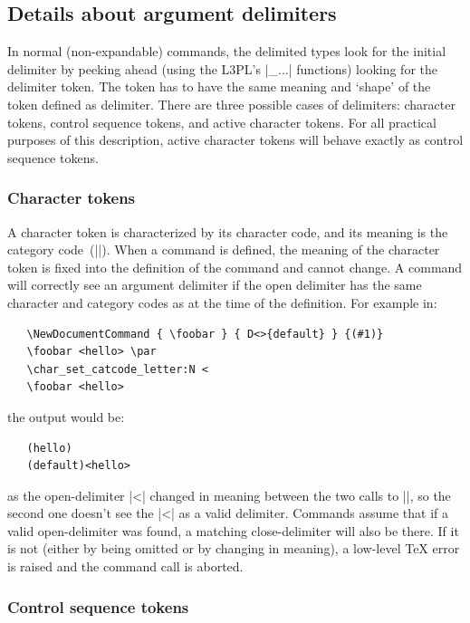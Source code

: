 \documentclass{ltxguide}
\begin{document}
\subsection{Details about argument delimiters}

In normal (non-expandable) commands, the delimited types look for the
initial delimiter by peeking ahead (using the L3PL's |\peek_...|
functions) looking for the delimiter token.  The token has to have the
same meaning and `shape' of the token defined as delimiter.
There are three possible cases of delimiters: character tokens, control
sequence tokens, and active character tokens.  For all practical purposes
of this description, active character tokens will behave exactly as
control sequence tokens.

\subsubsection{Character tokens}

A character token is characterized by its character code, and its meaning
is the category code~(|\catcode|).  When a command is defined, the meaning
of the character token is fixed into the definition of the command and
cannot change.  A command will correctly see an argument delimiter if
the open delimiter has the same character and category codes as at the
time of the definition.  For example in:
\begin{verbatim}
   \NewDocumentCommand { \foobar } { D<>{default} } {(#1)}
   \foobar <hello> \par
   \char_set_catcode_letter:N <
   \foobar <hello>
\end{verbatim}
the output would be:
\begin{verbatim}
   (hello)
   (default)<hello>
\end{verbatim}
as the open-delimiter |<| changed in meaning between the two calls to
|\foobar|, so the second one doesn't see the |<| as a valid delimiter.
Commands assume that if a valid open-delimiter was found, a matching
close-delimiter will also be there.  If it is not (either by being
omitted or by changing in meaning), a low-level \TeX{} error is raised
and the command call is aborted.

\subsubsection{Control sequence tokens}
\end{document}

